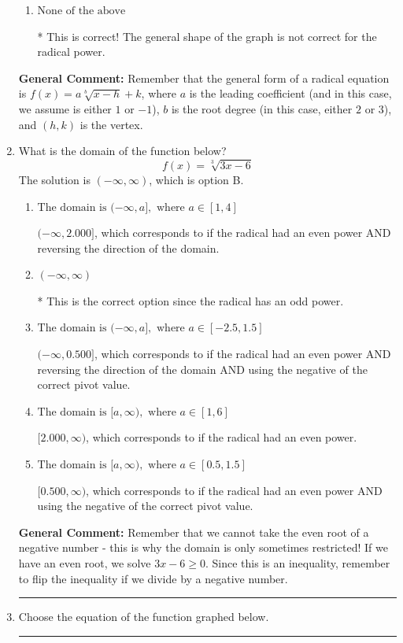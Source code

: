 \documentclass{extbook}[14pt]
\newcommand{\litem}[1]{\item #1

\rule{\textwidth}{0.4pt}}
\begin{document}
\begin{enumerate}
{\begin{enumerate}[label=\Alph*.]
This corresponds to switching the coefficient AND switching the $x$-value of the vertex with the root degree as $3$.
\item \( \text{None of the above} \)

* This is correct! The general shape of the graph is not correct for the radical power.
\end{enumerate}

\textbf{General Comment:} Remember that the general form of a radical equation is $ f(x) = a \sqrt[b]{x - h} + k$, where $a$ is the leading coefficient (and in this case, we assume is either $1$ or $-1$), $b$ is the root degree (in this case, either $2$ or $3$), and $(h, k)$ is the vertex.
}
\litem{
What is the domain of the function below?
\[ f(x) = \sqrt[3]{3 x - 6} \]The solution is \( (-\infty, \infty) \), which is option B.\begin{enumerate}[label=\Alph*.]
\item \( \text{The domain is } (-\infty, a], \text{   where } a \in [1, 4] \)

$(-\infty, 2.000]$, which corresponds to if the radical had an even power AND reversing the direction of the domain.
\item \( (-\infty, \infty) \)

* This is the correct option since the radical has an odd power.
\item \( \text{The domain is } (-\infty, a], \text{   where } a \in [-2.5, 1.5] \)

$(-\infty, 0.500]$, which corresponds to if the radical had an even power AND reversing the direction of the domain AND using the negative of the correct pivot value.
\item \( \text{The domain is } [a, \infty), \text{   where } a \in [1, 6] \)

$[2.000, \infty)$, which corresponds to if the radical had an even power.
\item \( \text{The domain is } [a, \infty), \text{   where } a \in [0.5, 1.5] \)

$[0.500, \infty)$, which corresponds to if the radical had an even power AND using the negative of the correct pivot value.
\end{enumerate}

\textbf{General Comment:} Remember that we cannot take the even root of a negative number - this is why the domain is only sometimes restricted! If we have an even root, we solve $3 x - 6 \geq 0$. Since this is an inequality, remember to flip the inequality if we divide by a negative number.
}
\litem{
Choose the equation of the function graphed below.

}
\end{enumerate}
\end{document}
